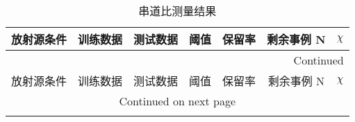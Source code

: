 \begin{longtable}{c c c c c c c}
    \caption{串道比测量结果}
    \label{tab:chiab}   \\
    \toprule
    放射源条件  &   训练数据    &   测试数据    &   阈值    &   保留率  &   剩余事例 N    &   $\chi$  \\
    \midrule
    \endfirsthead

    \multicolumn{7}{r}{Continued}\\
    \toprule
    放射源条件  &   训练数据    &   测试数据    &   阈值    &   保留率  &   剩余事例 N    &   $\chi$  \\
    \midrule
    \endhead

    \multicolumn{7}{c}{Continued on next page}\\
    \endfoot


\end{longtable}
